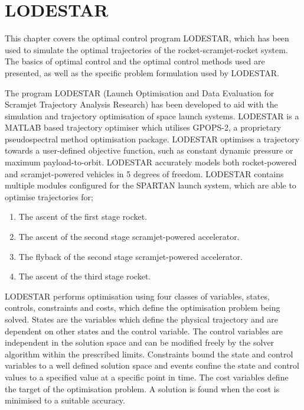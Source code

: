 
\cleardoublepage
\chapter{LODESTAR}\label{chapter:LODESTAR}	
This chapter covers the optimal control program LODESTAR, which has been used to simulate the optimal trajectories of the rocket-scramjet-rocket system. The basics of optimal control and the optimal control methods used are presented, as well as the specific problem formulation used by LODESTAR.

The program LODESTAR (Launch Optimisation and Data Evaluation for Scramjet Trajectory Analysis Research) has been developed to aid with the simulation and trajectory optimisation of space launch systems. LODESTAR is a MATLAB based trajectory optimiser which utilises GPOPS-2, a proprietary pseudospectral method optimisation package. LODESTAR optimises a trajectory towards a user-defined objective function, such as constant dynamic pressure or maximum payload-to-orbit. LODESTAR accurately models both rocket-powered and scramjet-powered vehicles in 5 degrees of freedom. LODESTAR contains multiple modules configured for the SPARTAN launch system, which are able to optimise trajectories for;

\begin{enumerate}
 \item The ascent of the first stage rocket.
 \item The ascent of the second stage scramjet-powered accelerator.
 \item The flyback of the second stage scramjet-powered accelerator.
 \item The ascent of the third stage rocket.
\end{enumerate}

LODESTAR performs optimisation using four classes of variables, states, controls, constraints and costs, which define the optimisation problem being solved. States are the variables which define the physical trajectory and are dependent on other states and the control variable. The control variables are independent in the solution space and can be modified freely by the solver algorithm within the prescribed limits.  Constraints bound the state and control variables to a well defined solution space and events confine the state and control values to a specified value at a specific point in time. The cost variables define the target of the optimisation problem. A solution is found when the cost is minimised to a suitable accuracy. 

